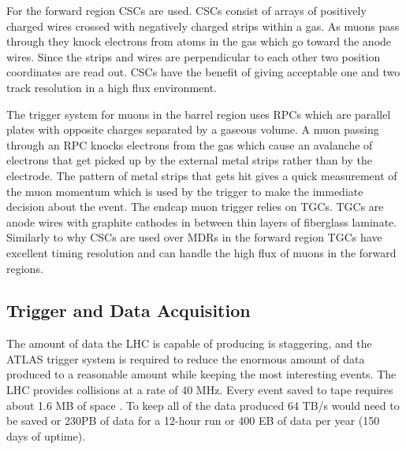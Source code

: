 For the forward region CSCs are used.  CSCs consist of arrays of positively charged wires crossed with negatively charged strips within a gas.  As muons pass through they knock electrons from atoms in the gas which go toward the anode wires. Since the strips and wires are perpendicular to each other two position coordinates are read out.  CSCs have the benefit of giving acceptable one and two track resolution in a high flux environment.

The trigger system for muons in the barrel region uses RPCs which are parallel plates with opposite charges separated by a gaseous volume. A muon passing through an RPC knocks electrons from the gas which cause an avalanche of electrons that get picked up by the external metal strips rather than by the electrode.  The pattern of metal strips that gets hit gives a quick measurement of the muon momentum which is used by the trigger to make the immediate decision about the event.
The endcap muon trigger relies on TGCs.  TGCs are anode wires with graphite cathodes in between thin layers of fiberglass laminate.  Similarly to why CSCs are used over MDRs in the forward region TGCs have excellent timing resolution and can handle the high flux of muons in the forward regions.


\subsection{Trigger and Data Acquisition}
\label{sec:TDAQ}
The amount of data the LHC is capable of producing is staggering, and the ATLAS trigger system is required to reduce the enormous amount of data produced to a reasonable amount while keeping the most interesting events.  The LHC provides collisions at a rate of 40 MHz.  Every event saved to tape requires about 1.6 MB of space \cite{Outreach:1457044}. To keep all of the data produced 64 TB/s would need to be saved or 230PB of data for a 12-hour run or 400 EB of data per year (150 days of uptime). 

